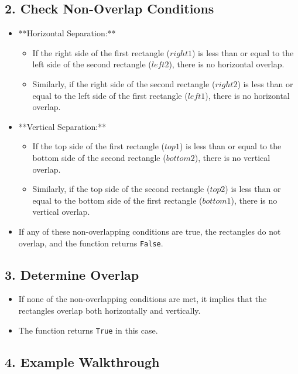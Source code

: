 \subsection*{2. Check Non-Overlap Conditions}

\begin{itemize}
    \item **Horizontal Separation:**
    \begin{itemize}
        \item If the right side of the first rectangle (\(right1\)) is less than or equal to the left side of the second rectangle (\(left2\)), there is no horizontal overlap.
        \item Similarly, if the right side of the second rectangle (\(right2\)) is less than or equal to the left side of the first rectangle (\(left1\)), there is no horizontal overlap.
    \end{itemize}
    
    \item **Vertical Separation:**
    \begin{itemize}
        \item If the top side of the first rectangle (\(top1\)) is less than or equal to the bottom side of the second rectangle (\(bottom2\)), there is no vertical overlap.
        \item Similarly, if the top side of the second rectangle (\(top2\)) is less than or equal to the bottom side of the first rectangle (\(bottom1\)), there is no vertical overlap.
    \end{itemize}
    
    \item If any of these non-overlapping conditions are true, the rectangles do not overlap, and the function returns \texttt{False}.
\end{itemize}

\subsection*{3. Determine Overlap}

\begin{itemize}
    \item If none of the non-overlapping conditions are met, it implies that the rectangles overlap both horizontally and vertically.
    \item The function returns \texttt{True} in this case.
\end{itemize}

\subsection*{4. Example Walkthrough}


